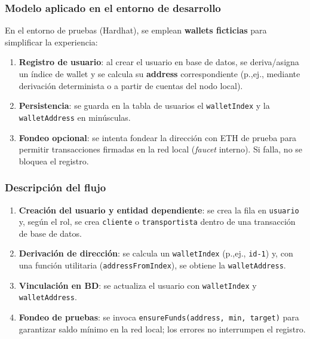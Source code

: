 \subsubsection{Modelo aplicado en el entorno de desarrollo}
En el entorno de pruebas (Hardhat), se emplean \textbf{wallets ficticias} para simplificar la experiencia:
\begin{enumerate}
\item \textbf{Registro de usuario}: al crear el usuario en base de datos, se deriva/asigna un índice de wallet y se calcula su \textbf{address} correspondiente (p.,ej., mediante derivación determinista o a partir de cuentas del nodo local).
\item \textbf{Persistencia}: se guarda en la tabla de usuarios el \texttt{walletIndex} y la \texttt{walletAddress} en minúsculas.
\item \textbf{Fondeo opcional}: se intenta fondear la dirección con ETH de prueba para permitir transacciones firmadas en la red local (\textit{faucet} interno). Si falla, no se bloquea el registro.
\end{enumerate}

\subsubsection{Descripción del flujo }
\begin{enumerate}
\item \textbf{Creación del usuario y entidad dependiente}: se crea la fila en \texttt{usuario} y, según el rol, se crea \texttt{cliente} o \texttt{transportista} dentro de una transacción de base de datos.
\item \textbf{Derivación de dirección}: se calcula un \texttt{walletIndex} (p.,ej., \texttt{id-1}) y, con una función utilitaria (\texttt{addressFromIndex}), se obtiene la \texttt{walletAddress}.
\item \textbf{Vinculación en BD}: se actualiza el usuario con \texttt{walletIndex} y \texttt{walletAddress}.
\item \textbf{Fondeo de pruebas}: se invoca \texttt{ensureFunds(address, min, target)} para garantizar saldo mínimo en la red local; los errores no interrumpen el registro.
\end{enumerate}

